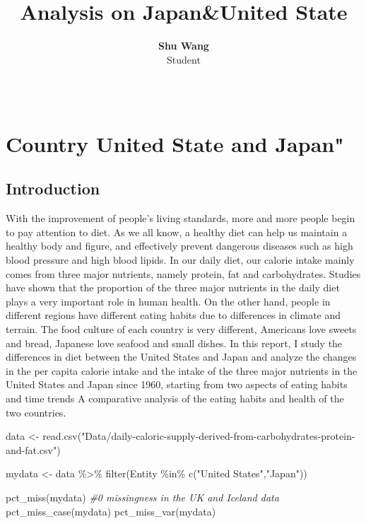 \documentclass[11pt,a4paper,]{article}
\title{Analysis on Japan\&United State}
\author{\sf\Large\textbf{ Shu Wang}\\ {\sf\large Student\\[0.5cm]}}
\date{\sf\Date~\Month~\Year}
\makeatletter
\newenvironment{Shaded}{\begin{snugshade}}{\end{snugshade}}
\newcommand{\CommentTok}[1]{\textcolor[rgb]{0.56,0.35,0.01}{\textit{#1}}}
\newcommand{\FunctionTok}[1]{\textcolor[rgb]{0.00,0.00,0.00}{#1}}
\newcommand{\NormalTok}[1]{#1}
\newcommand{\OtherTok}[1]{\textcolor[rgb]{0.56,0.35,0.01}{#1}}
\newcommand{\SpecialCharTok}[1]{\textcolor[rgb]{0.00,0.00,0.00}{#1}}
\newcommand{\StringTok}[1]{\textcolor[rgb]{0.31,0.60,0.02}{#1}}
\def\titlepage{\front{\expandafter{\@title}}{\@author}{\@organization}}
\makeatother
\begin{document}
\titlepage

\newpage
\section*{Country United State and Japan"}
\subsection*{Introduction}

With the improvement of people's living standards, more and more people begin to pay attention to diet. As we all know, a healthy diet can help us maintain a healthy body and figure, and effectively prevent dangerous diseases such as high blood pressure and high blood lipids. In our daily diet, our calorie intake mainly comes from three major nutrients, namely protein, fat and carbohydrates. Studies have shown that the proportion of the three major nutrients in the daily diet plays a very important role in human health. On the other hand, people in different regions have different eating habits due to differences in climate and terrain. The food culture of each country is very different, Americans love sweets and bread, Japanese love seafood and small dishes.
In this report, I study the differences in diet between the United States and Japan and analyze the changes in the per capita calorie intake and the intake of the three major nutrients in the United States and Japan since 1960, starting from two aspects of eating habits and time trends A comparative analysis of the eating habits and health of the two countries.

\begin{Shaded}
\begin{Highlighting}[]
\NormalTok{data }\OtherTok{\textless{}{-}} \FunctionTok{read.csv}\NormalTok{(}\StringTok{"Data/daily{-}caloric{-}supply{-}derived{-}from{-}carbohydrates{-}protein{-}and{-}fat.csv"}\NormalTok{)}

\NormalTok{mydata }\OtherTok{\textless{}{-}}\NormalTok{ data }\SpecialCharTok{\%\textgreater{}\%} \FunctionTok{filter}\NormalTok{(Entity }\SpecialCharTok{\%in\%} \FunctionTok{c}\NormalTok{(}\StringTok{"United States"}\NormalTok{,}\StringTok{"Japan"}\NormalTok{))}
\end{Highlighting}
\end{Shaded}

\begin{Shaded}
\begin{Highlighting}[]
\FunctionTok{pct\_miss}\NormalTok{(mydata) }\CommentTok{\#0 missingness in the UK and Iceland data}
\FunctionTok{pct\_miss\_case}\NormalTok{(mydata)}
\FunctionTok{pct\_miss\_var}\NormalTok{(mydata)}
\end{Highlighting}
\end{Shaded}
\end{document}
